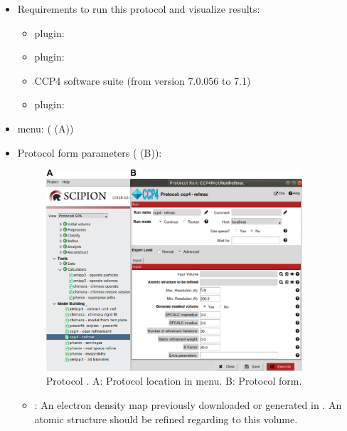 \begin{itemize}
  \item Requirements to run this protocol and visualize results:
    \begin{itemize}
        \item \scipion plugin: 
        \item \scipion plugin: 
        \item CCP4 software suite (from version 7.0.056 to 7.1)
        \item \scipion plugin: 
    \end{itemize}
  \item \scipion menu:
    ( (A))
  
  \item Protocol form parameters ( (B)):
  
    \begin{figure}[H]
     \centering 
     \captionsetup{width=.9\linewidth} 
     \includegraphics[width=0.90\textwidth]{Images_appendix/Fig126.pdf}
     \caption{Protocol . A: Protocol location in \scipion menu. B: Protocol form.}
     \label{fig:app_protocol_refmac_1}
    \end{figure}

    \begin{itemize}
     \item {}: An electron density map previously downloaded or generated in \scipion. An atomic structure should be refined regarding to this volume.
     

\end{itemize}
\end{itemize}
